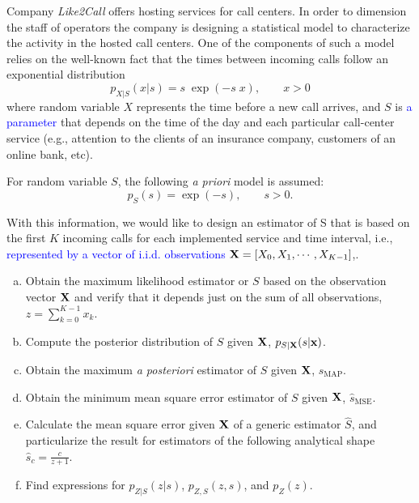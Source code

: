 \begin{prob}
\label{ProbEstLab}

Company {\em Like2Call} offers hosting services for call centers. In order to dimension the staff of operators the company is designing a statistical model to characterize the activity in the hosted call centers. One of the components of such a model relies on the well-known fact that the times between incoming calls follow an exponential distribution
$$p_{X|S}(x|s) = s \; \exp(-s\; x), \qquad x>0$$
where random variable $X$ represents the time before a new call arrives, and $S$ is \textcolor{blue}{a parameter} that depends on the time of the day and each particular call-center service (e.g., attention to the clients of an insurance company, customers of an online bank, etc). 

For random variable $S$, the following {\em a priori} model is assumed:
$$p_S(s) = \exp(-s), \qquad s>0.$$

With this information, we would like to design an estimator of S that is based on the first $K$ incoming calls for each implemented service and time interval, i.e., \textcolor{blue}{represented by a vector of i.i.d. observations} ${\bf X} = \left[X_0, X_1, \cdots, X_{K-1}\right]$,.

\begin{enumerate}[a)]
    \item Obtain the maximum likelihood estimator or $S$ based on the observation vector $\bf X$ and verify that it depends just on the sum of all observations, $z=\sum_{k=0}^{K-1} x_k$.
    
    \item Compute the posterior distribution of $S$ given $\bf X$, $p_{S|{\bf X}}(s|{\bf x})$.
    
    \item Obtain the maximum {\em a posteriori} estimator of $S$ given $\bf X$, ${\hat s}_\text{MAP}$.
    
    \item Obtain the minimum mean square error estimator of $S$ given $\bf X$, ${\hat s}_\text{MSE}$.
    
    \item Calculate the mean square error given ${\bf X}$ of a generic estimator $\hat S$, and particularize the result for estimators of the following analytical shape $\hat{s}_c = \frac{c}{z+1}$.

    \item Find expressions for $p_{Z|S}(z|s)$, $p_{Z,S}(z,s)$, and $p_{Z}(z)$.
    

\end{enumerate}
\end{prob}

